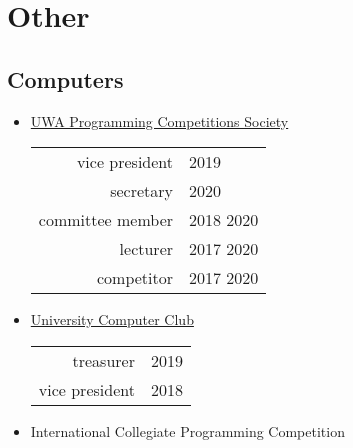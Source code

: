 \documentclass[a4paper]{style}
\begin{document}
\begin{minipage}[t]{0.45\textwidth}
\sectionspace{} %


\section{Other}
\subsection{Computers}
\vspace{5pt}
\begin{itemize}
    \item \href{https://pcs.org.au/about/}{UWA Programming Competitions Society}
        \begin{tabular}{r|l}
            vice president & 2019 \\
            secretary & 2020 \\
            committee member & 2018 \textendash{} 2020 \\
            lecturer & 2017 \textendash{} 2020 \\
            competitor & 2017 \textendash{} 2020
        \end{tabular}
    \item \href{https://ucc.asn.au}{University Computer Club} \\
        \begin{tabular}{r|l}
            \hspace{20pt} treasurer & 2019 \\
            \hspace{22pt} vice president & 2018
        \end{tabular}
    \item \small{International Collegiate Programming Competition}
\end{itemize}

\end{minipage}
\end{document}
